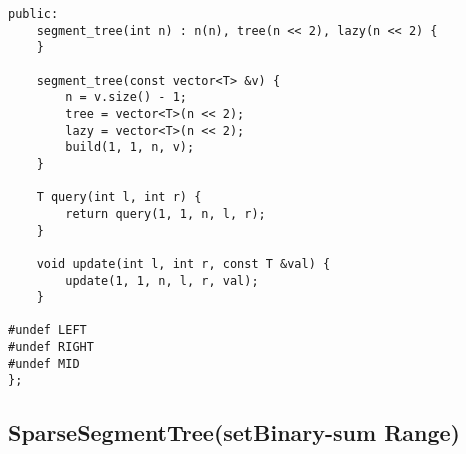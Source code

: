 \documentclass{article}
\begin{document}
\begin{verbatim}
public:
    segment_tree(int n) : n(n), tree(n << 2), lazy(n << 2) {
    }

    segment_tree(const vector<T> &v) {
        n = v.size() - 1;
        tree = vector<T>(n << 2);
        lazy = vector<T>(n << 2);
        build(1, 1, n, v);
    }

    T query(int l, int r) {
        return query(1, 1, n, l, r);
    }

    void update(int l, int r, const T &val) {
        update(1, 1, n, l, r, val);
    }

#undef LEFT
#undef RIGHT
#undef MID
};
\end{verbatim}

\subsection{SparseSegmentTree(setBinary-sum Range)}
\end{document}

